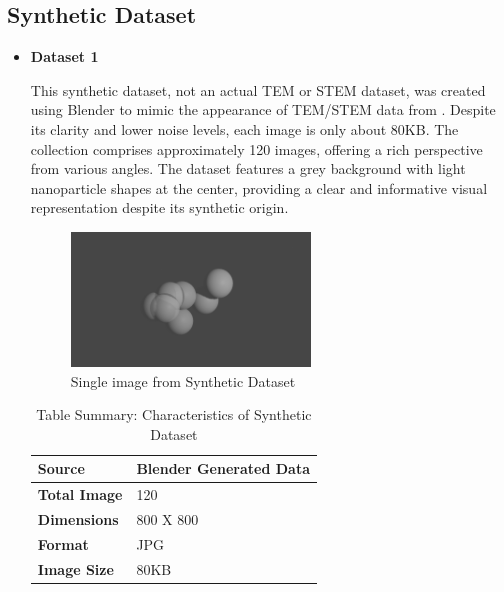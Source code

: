 \subsection{Synthetic Dataset}
\begin{itemize}
        \item \textbf{Dataset 1}

        This synthetic dataset, not an actual TEM or STEM dataset, was created using Blender to mimic the appearance of TEM/STEM data from \cite{Rakib2024}. Despite its clarity and lower noise levels, each image is only about 80KB. The collection comprises approximately 120 images, offering a rich perspective from various angles. The dataset features a grey background with light nanoparticle shapes at the center, providing a clear and informative visual representation despite its synthetic origin.

        \begin{figure}[H]
            \centering
            \includegraphics[width=0.6\textwidth]{img/Results/Synthetic data/Single_SYN_D.png}
            \caption{Single image from Synthetic Dataset \cite{Rakib2024}}\label{fig:Synthetic Image}
        \end{figure}
        
        \begin{table}[H]
              \centering
              \caption{Table Summary: Characteristics of Synthetic Dataset}
              \begin{tabularx}{0.7\linewidth}{|X|X|}
                \hline
                \textbf{Source} & Blender Generated Data \\
                \hline
                \textbf{Total Image} & 120 \\
                \hline
                \textbf{Dimensions} & 800 X 800\\
                \hline
                \textbf{Format} & JPG \\
                \hline
                \textbf{Image Size} & 80KB \\
                \hline
              \end{tabularx}
         \end{table}
        

\end{itemize}

